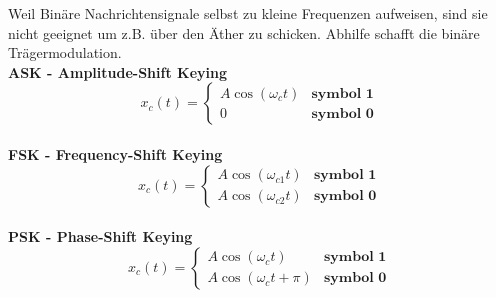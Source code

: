 \begin{minipage}{9cm}
	Weil Binäre Nachrichtensignale selbst zu kleine Frequenzen aufweisen, sind sie nicht geeignet um
	z.B. über den Äther zu schicken. Abhilfe schafft die binäre Trägermodulation. 
	\vspace{1cm}  \\
	\textbf{ASK - Amplitude-Shift Keying} \\
	$$x_c(t) = \begin{cases}
           A \cos(\omega_c t) & \textbf{symbol 1} \\
           0 & \textbf{symbol 0}
           \end{cases} $$ \\
	\textbf{FSK - Frequency-Shift Keying} \\
	$$x_c(t) = \begin{cases}
           A \cos(\omega_{c1} t) & \textbf{symbol 1}     \\         
           A \cos(\omega_{c2} t) & \textbf{symbol 0}
           \end{cases} $$ \\
	\textbf{PSK - Phase-Shift Keying} \\
	$$x_c(t) = \begin{cases}
           A \cos(\omega_{c} t) & \textbf{symbol 1}        \\      
           A \cos(\omega_{c} t + \pi) & \textbf{symbol 0}
           \end{cases} $$ \\
\end{minipage}

